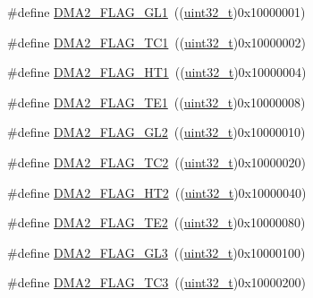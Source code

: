 \begin{DoxyCompactItemize}
\item 
\#define \hyperlink{group___d_m_a__flags__definition_ga34b82697f14e2fa9f7abeb4c43502822}{D\+M\+A2\+\_\+\+F\+L\+A\+G\+\_\+\+G\+L1}~((\hyperlink{_p_e___types_8h_a33594304e786b158f3fb30289278f5af}{uint32\+\_\+t})0x10000001)
\item 
\#define \hyperlink{group___d_m_a__flags__definition_ga828c97967dbdb48d267ed0f0c4e9b8a5}{D\+M\+A2\+\_\+\+F\+L\+A\+G\+\_\+\+T\+C1}~((\hyperlink{_p_e___types_8h_a33594304e786b158f3fb30289278f5af}{uint32\+\_\+t})0x10000002)
\item 
\#define \hyperlink{group___d_m_a__flags__definition_ga2264376d92756f07122883c8f3359258}{D\+M\+A2\+\_\+\+F\+L\+A\+G\+\_\+\+H\+T1}~((\hyperlink{_p_e___types_8h_a33594304e786b158f3fb30289278f5af}{uint32\+\_\+t})0x10000004)
\item 
\#define \hyperlink{group___d_m_a__flags__definition_ga415793b309369076a9d797ad0757a9c1}{D\+M\+A2\+\_\+\+F\+L\+A\+G\+\_\+\+T\+E1}~((\hyperlink{_p_e___types_8h_a33594304e786b158f3fb30289278f5af}{uint32\+\_\+t})0x10000008)
\item 
\#define \hyperlink{group___d_m_a__flags__definition_gaa646f1ffc4468931a748ecff6440d40f}{D\+M\+A2\+\_\+\+F\+L\+A\+G\+\_\+\+G\+L2}~((\hyperlink{_p_e___types_8h_a33594304e786b158f3fb30289278f5af}{uint32\+\_\+t})0x10000010)
\item 
\#define \hyperlink{group___d_m_a__flags__definition_ga7da2f61b8c67923904312796fd76def3}{D\+M\+A2\+\_\+\+F\+L\+A\+G\+\_\+\+T\+C2}~((\hyperlink{_p_e___types_8h_a33594304e786b158f3fb30289278f5af}{uint32\+\_\+t})0x10000020)
\item 
\#define \hyperlink{group___d_m_a__flags__definition_gaa4ecfdaca0509737af68143d23d0267c}{D\+M\+A2\+\_\+\+F\+L\+A\+G\+\_\+\+H\+T2}~((\hyperlink{_p_e___types_8h_a33594304e786b158f3fb30289278f5af}{uint32\+\_\+t})0x10000040)
\item 
\#define \hyperlink{group___d_m_a__flags__definition_ga3d396b14851e789ad549126da55b7f3f}{D\+M\+A2\+\_\+\+F\+L\+A\+G\+\_\+\+T\+E2}~((\hyperlink{_p_e___types_8h_a33594304e786b158f3fb30289278f5af}{uint32\+\_\+t})0x10000080)
\item 
\#define \hyperlink{group___d_m_a__flags__definition_ga4c56bb0c92db51e9147b122f2dff1c0a}{D\+M\+A2\+\_\+\+F\+L\+A\+G\+\_\+\+G\+L3}~((\hyperlink{_p_e___types_8h_a33594304e786b158f3fb30289278f5af}{uint32\+\_\+t})0x10000100)
\item 
\#define \hyperlink{group___d_m_a__flags__definition_ga3b704db8a45d4410509f3552e8b2095f}{D\+M\+A2\+\_\+\+F\+L\+A\+G\+\_\+\+T\+C3}~((\hyperlink{_p_e___types_8h_a33594304e786b158f3fb30289278f5af}{uint32\+\_\+t})0x10000200)

\end{DoxyCompactItemize}

